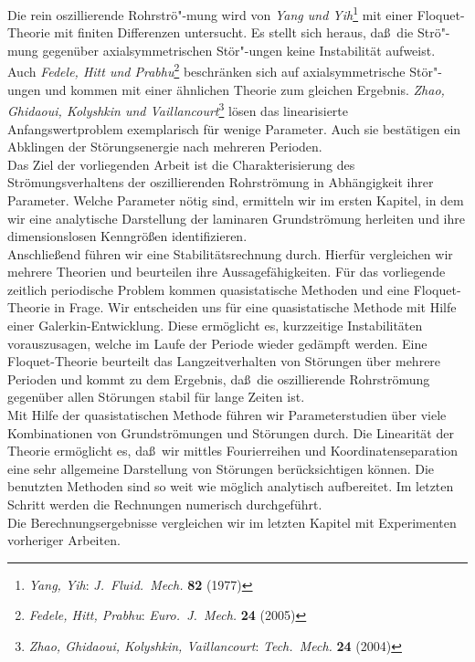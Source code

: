 \documentclass[10pt,a5paper,oneside,draft]{book}
\numberwithin{equation}{chapter}
\begin{document}
Die rein oszillierende Rohrstr\"o"-mung wird von \textsl{Yang und Yih}\footnote{\label{bib:yang_yih}\textsl{Yang, Yih}: \textit{J.\ Fluid.\ Mech.} \textbf{82} (1977)} mit einer Floquet-\!Theorie mit finiten Differenzen untersucht.
Es stellt sich heraus, da\ss\ die Str\"o"-mung gegen\"uber axialsymmetrischen St\"or"-ungen keine Instabilit\"at aufweist.
Auch \textsl{Fedele, Hitt und Prabhu}\footnote{\label{bib:fedele_hitt}\textsl{Fedele, Hitt, Prabhu}: \textit{Euro.\ J.\ Mech.} \textbf{24} (2005)} beschr\"anken sich auf axialsymmetrische St\"or"-ungen und kommen mit einer \"ahnlichen Theorie zum gleichen Ergebnis.
\textsl{Zhao, Ghidaoui, Kolyshkin und Vaillancourt}\footnote{\label{bib:zhao_ghidaoui}\textsl{Zhao, Ghidaoui, Kolyshkin, Vaillancourt}: \textit{Tech.\ Mech.} \textbf{24} (2004)}
l\"osen das linearisierte Anfangswertproblem exemplarisch f\"ur wenige Parameter.
Auch sie best\"atigen ein Abklingen der St\"orungsenergie nach mehreren Perioden.\\

Das Ziel der vorliegenden Arbeit ist die Charakterisierung des Str\"omungsverhaltens der oszillierenden Rohrstr\"omung in Abh\"angigkeit ihrer Parameter.
Welche Parameter n\"otig sind, ermitteln wir im ersten Kapitel, in dem wir eine analytische Darstellung der laminaren Grundstr\"omung herleiten und ihre dimensionslosen Kenngr\"o\ss en identifizieren.\\
Anschlie\ss end f\"uhren wir eine Stabilit\"atsrechnung durch.
Hierf\"ur vergleichen wir mehrere Theorien und beurteilen ihre Aussagef\"ahigkeiten.
F\"ur das vorliegende zeitlich periodische Problem kommen quasistatische Methoden und eine Floquet-\!Theorie in Frage.
Wir entscheiden uns f\"ur eine quasistatische Methode mit Hilfe einer Galerkin-Entwicklung.
Diese erm\"oglicht es, kurzzeitige Instabilit\"aten vorauszusagen, welche im Laufe der Periode wieder ged\"ampft werden.
Eine Floquet-\!Theorie beurteilt das Langzeitverhalten von St\"orungen \"uber mehrere Perioden und kommt zu dem Ergebnis, da\ss\ die oszillierende Rohrstr\"omung gegen\"uber allen St\"orungen stabil f\"ur lange Zeiten ist.\\
Mit Hilfe der quasistatischen Methode f\"uhren wir Parameterstudien \"uber viele Kombinationen von Grundstr\"omungen und St\"orungen durch.
Die Linearit\"at der Theorie erm\"oglicht es, da\ss\ wir mittles Fourierreihen und Koordinatenseparation eine sehr allgemeine Darstellung von St\"orungen ber\"ucksichtigen k\"onnen.
Die benutzten Methoden sind so weit wie m\"oglich analytisch aufbereitet.
Im letzten Schritt werden die Rechnungen numerisch durchgef\"uhrt.\\
Die Berechnungsergebnisse vergleichen wir im letzten Kapitel mit Experimenten vorheriger Arbeiten.\\
\end{document}
